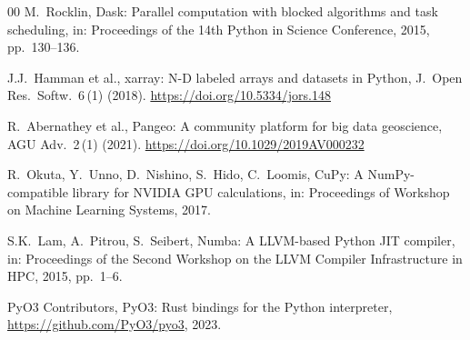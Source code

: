 \documentclass[preprint,12pt,a4paper]{elsarticle}
\begin{document}
\begin{thebibliography}{00}
M.~Rocklin,
Dask: Parallel computation with blocked algorithms and task
scheduling,
in: Proceedings of the 14th Python in Science Conference,
2015, pp.~130--136.

J.J.~Hamman et al.,
xarray: N-D labeled arrays and datasets in Python,
J.\ Open Res.\ Softw.\ 6\,(1) (2018).
\url{https://doi.org/10.5334/jors.148}

R.~Abernathey et al.,
Pangeo: A community platform for big data geoscience,
AGU Adv.\ 2\,(1) (2021).
\url{https://doi.org/10.1029/2019AV000232}

R.~Okuta, Y.~Unno, D.~Nishino, S.~Hido, C.~Loomis,
CuPy: A NumPy-compatible library for NVIDIA GPU calculations,
in: Proceedings of Workshop on Machine Learning Systems,
2017.

S.K.~Lam, A.~Pitrou, S.~Seibert,
Numba: A LLVM-based Python JIT compiler,
in: Proceedings of the Second Workshop on the LLVM Compiler
Infrastructure in HPC,
2015, pp.~1--6.

PyO3 Contributors,
PyO3: Rust bindings for the Python interpreter,
\url{https://github.com/PyO3/pyo3}, 2023.

\end{thebibliography}
\end{document}
